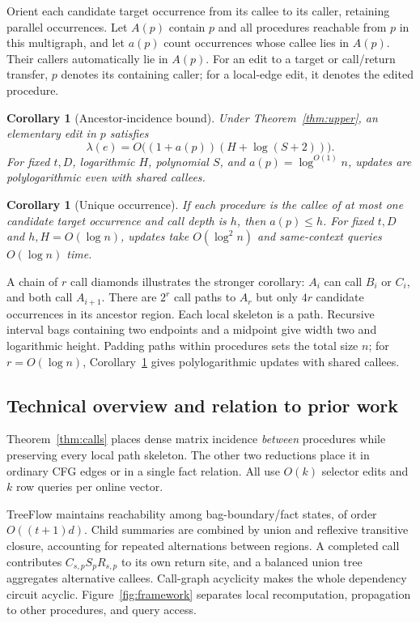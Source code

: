 \documentclass[11pt,letterpaper]{article}
\newtheorem{corollary}[theorem]{Corollary}
\theoremstyle{definition}
\begin{document}
Orient each candidate target occurrence from its callee to its caller,
retaining parallel occurrences. Let $A(p)$ contain $p$ and all procedures
reachable from $p$ in this multigraph, and let $a(p)$ count occurrences
whose callee lies in $A(p)$. Their callers automatically lie in $A(p)$.
For an edit to a target or call/return transfer, $p$ denotes its containing
caller; for a local-edge edit, it denotes the edited procedure.

\begin{corollary}[Ancestor-incidence bound]\label{cor:sharing}
Under Theorem~\ref{thm:upper}, an elementary edit in $p$ satisfies
\[
 \lambda(e)=O\bigl((1+a(p))(H+\log(S+2))\bigr).
\]
For fixed $t,D$, logarithmic $H$, polynomial $S$, and
$a(p)=\log^{O(1)}n$, updates are polylogarithmic even with shared callees.
\end{corollary}

\begin{corollary}[Unique occurrence]\label{cor:forest}
If each procedure is the callee of at most one candidate target occurrence
and call depth is $h$, then $a(p)\le h$. For fixed $t,D$ and
$h,H=O(\log n)$, updates take $O(\log^2 n)$ and same-context queries
$O(\log n)$ time.
\end{corollary}

A chain of $r$ call diamonds illustrates the stronger corollary: $A_i$
can call $B_i$ or $C_i$, and both call $A_{i+1}$. There are $2^r$
call paths to $A_r$ but only $4r$ candidate occurrences in its ancestor
region. Each local skeleton is a path. Recursive interval bags containing two
endpoints and a midpoint give width two and logarithmic height. Padding
paths within procedures sets the total size $n$; for $r=O(\log n)$,
Corollary~\ref{cor:sharing} gives polylogarithmic updates with shared callees.

\subsection{Technical overview and relation to prior work}
Theorem~\ref{thm:calls} places dense matrix incidence \emph{between}
procedures while preserving every local path skeleton. The other two
reductions place it in ordinary CFG edges or in a single fact relation.
All use $O(k)$ selector edits and $k$ row queries per online vector.

TreeFlow maintains reachability among bag-boundary/fact states, of order
$O((t+1)d)$. Child summaries are combined by union and reflexive transitive
closure, accounting for repeated alternations between regions. A completed
call contributes $C_{s,p}S_pR_{s,p}$ to its own return site, and a balanced
union tree aggregates alternative callees. Call-graph acyclicity makes the
whole dependency circuit acyclic. Figure~\ref{fig:framework} separates local
recomputation, propagation to other procedures, and query access.
\end{document}
